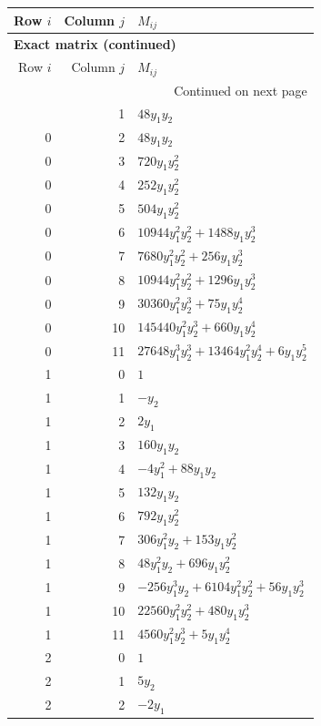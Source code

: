 \documentclass[10pt,a4paper]{article}
\begin{document}
{\small\setlength{\tabcolsep}{7pt}\begin{longtable}{rrp{125mm}}
\toprule Row $i$ & Column $j$ & $M_{ij}$\\\midrule\endfirsthead
\multicolumn{3}{l}{\textbf{Exact matrix (continued)}}\\
\toprule Row $i$ & Column $j$ & $M_{ij}$\\\midrule\endhead
\midrule\multicolumn{3}{r}{Continued on next page}\\\endfoot\bottomrule\endlastfoot
0 & 1 & $48 y_{1} y_{2}$\\
0 & 2 & $48 y_{1} y_{2}$\\
0 & 3 & $720 y_{1} y_{2}^{2}$\\
0 & 4 & $252 y_{1} y_{2}^{2}$\\
0 & 5 & $504 y_{1} y_{2}^{2}$\\
0 & 6 & $10944 y_{1}^{2} y_{2}^{2} + 1488 y_{1} y_{2}^{3}$\\
0 & 7 & $7680 y_{1}^{2} y_{2}^{2} + 256 y_{1} y_{2}^{3}$\\
0 & 8 & $10944 y_{1}^{2} y_{2}^{2} + 1296 y_{1} y_{2}^{3}$\\
0 & 9 & $30360 y_{1}^{2} y_{2}^{3} + 75 y_{1} y_{2}^{4}$\\
0 & 10 & $145440 y_{1}^{2} y_{2}^{3} + 660 y_{1} y_{2}^{4}$\\
0 & 11 & $27648 y_{1}^{3} y_{2}^{3} + 13464 y_{1}^{2} y_{2}^{4} + 6 y_{1} y_{2}^{5}$\\
1 & 0 & $1$\\
1 & 1 & $- y_{2}$\\
1 & 2 & $2 y_{1}$\\
1 & 3 & $160 y_{1} y_{2}$\\
1 & 4 & $- 4 y_{1}^{2} + 88 y_{1} y_{2}$\\
1 & 5 & $132 y_{1} y_{2}$\\
1 & 6 & $792 y_{1} y_{2}^{2}$\\
1 & 7 & $306 y_{1}^{2} y_{2} + 153 y_{1} y_{2}^{2}$\\
1 & 8 & $48 y_{1}^{2} y_{2} + 696 y_{1} y_{2}^{2}$\\
1 & 9 & $- 256 y_{1}^{3} y_{2} + 6104 y_{1}^{2} y_{2}^{2} + 56 y_{1} y_{2}^{3}$\\
1 & 10 & $22560 y_{1}^{2} y_{2}^{2} + 480 y_{1} y_{2}^{3}$\\
1 & 11 & $4560 y_{1}^{2} y_{2}^{3} + 5 y_{1} y_{2}^{4}$\\
2 & 0 & $1$\\
2 & 1 & $5 y_{2}$\\
2 & 2 & $- 2 y_{1}$\\

\end{longtable}}
\end{document}
